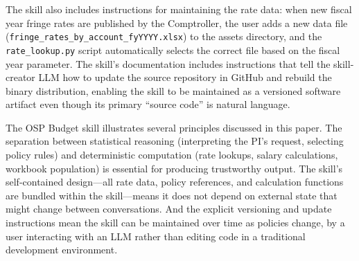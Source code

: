 \documentclass[12pt]{article}
\begin{document}
The skill also includes instructions for maintaining the rate data: when new fiscal year fringe rates are published by the Comptroller, the user adds a new data file (\texttt{fringe\_rates\_by\_account\_fyYYYY.xlsx}) to the assets directory, and the \texttt{rate\_lookup.py} script automatically selects the correct file based on the fiscal year parameter. The skill's documentation includes instructions that tell the skill-creator LLM how to update the source repository in GitHub and rebuild the binary distribution, enabling the skill to be maintained as a versioned software artifact even though its primary ``source code'' is natural language.

The OSP Budget skill illustrates several principles discussed in this paper. The separation between statistical reasoning (interpreting the PI's request, selecting policy rules) and deterministic computation (rate lookups, salary calculations, workbook population) is essential for producing trustworthy output. The skill's self-contained design---all rate data, policy references, and calculation functions are bundled within the skill---means it does not depend on external state that might change between conversations. And the explicit versioning and update instructions mean the skill can be maintained over time as policies change, by a user interacting with an LLM rather than editing code in a traditional development environment.



\end{document}
